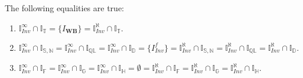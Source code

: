 \begin{proposition}\label{prop:intersections1}
	The following equalities are true:
	\begin{enumerate}[label=(\roman*)]
		\item $\mathbb{I}^{\infty}_{Inv} \cap \mathbb{I}_{\mathbb{T}} = \{I_{\textbf{WB}}\} = \mathbb{I}^{\aleph}_{Inv} \cap \mathbb{I}_{\mathbb{T}}.$
		\item $\mathbb{I}^{\infty}_{Inv} \cap \mathbb{I}_{\mathbb{S},\mathbb{N}} = \mathbb{I}^{\infty}_{Inv} \cap \mathbb{I}_{\mathbb{QL}} = \mathbb{I}^{\infty}_{Inv} \cap \mathbb{I}_{\mathbb{D}} = \{I_{Inv}^{f}\} = \mathbb{I}^{\aleph}_{Inv} \cap \mathbb{I}_{\mathbb{S},\mathbb{N}} = \mathbb{I}^{\aleph}_{Inv} \cap \mathbb{I}_{\mathbb{QL}} = \mathbb{I}^{\aleph}_{Inv} \cap \mathbb{I}_{\mathbb{D}}$.
		\item $\mathbb{I}^{\infty}_{Inv} \cap \mathbb{I}_{\mathbb{F}} = \mathbb{I}^{\infty}_{Inv} \cap \mathbb{I}_{\mathbb{G}} =\mathbb{I}^{\infty}_{Inv} \cap \mathbb{I}_{\mathbb{H}}= \emptyset = \mathbb{I}^{\aleph}_{Inv} \cap \mathbb{I}_{\mathbb{F}} = \mathbb{I}^{\aleph}_{Inv} \cap \mathbb{I}_{\mathbb{G}} =\mathbb{I}^{\aleph}_{Inv} \cap \mathbb{I}_{\mathbb{H}}.$
	\end{enumerate}
\end{proposition}
